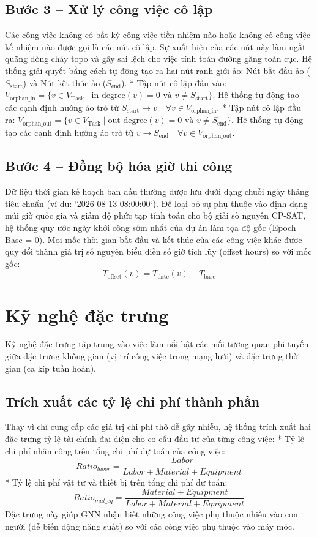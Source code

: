 \subsection{Bước 3 -- Xử lý công việc cô lập}
Các công việc không có bất kỳ công việc tiền nhiệm nào hoặc không có công việc kế nhiệm nào được gọi là các nút cô lập. Sự xuất hiện của các nút này làm ngắt quãng dòng chảy topo và gây sai lệch cho việc tính toán đường găng toàn cục. Hệ thống giải quyết bằng cách tự động tạo ra hai nút ranh giới ảo: Nút bắt đầu ảo ($S_{\text{start}}$) và Nút kết thúc ảo ($S_{\text{end}}$).
* Tập nút cô lập đầu vào: $V_{\text{orphan\_in}} = \{v \in V_{\text{Task}} \mid \text{in-degree}(v) = 0 \text{ và } v \neq S_{\text{start}}\}$. Hệ thống tự động tạo các cạnh định hướng ảo trỏ từ $S_{\text{start}} \rightarrow v \quad \forall v \in V_{\text{orphan\_in}}$.
* Tập nút cô lập đầu ra: $V_{\text{orphan\_out}} = \{v \in V_{\text{Task}} \mid \text{out-degree}(v) = 0 \text{ và } v \neq S_{\text{end}}\}$. Hệ thống tự động tạo các cạnh định hướng ảo trỏ từ $v \rightarrow S_{\text{end}} \quad \forall v \in V_{\text{orphan\_out}}$.

\subsection{Bước 4 -- Đồng bộ hóa giờ thi công}
Dữ liệu thời gian kế hoạch ban đầu thường được lưu dưới dạng chuỗi ngày tháng tiêu chuẩn (ví dụ: `2026-08-13 08:00:00`). Để loại bỏ sự phụ thuộc vào định dạng múi giờ quốc gia và giảm độ phức tạp tính toán cho bộ giải số nguyên CP-SAT, hệ thống quy ước ngày khởi công sớm nhất của dự án làm tọa độ gốc (Epoch Base = 0). Mọi mốc thời gian bắt đầu và kết thúc của các công việc khác được quy đổi thành giá trị số nguyên biểu diễn số giờ tích lũy (offset hours) so với mốc gốc:
$$T_{\text{offset}}(v) = T_{\text{date}}(v) - T_{\text{base}}$$

\section{Kỹ nghệ đặc trưng}
\label{sec:2.6_feature_engineering}

Kỹ nghệ đặc trưng tập trung vào việc làm nổi bật các mối tương quan phi tuyến giữa đặc trưng không gian (vị trí công việc trong mạng lưới) và đặc trưng thời gian (ca kíp tuần hoàn).

\subsection{Trích xuất các tỷ lệ chi phí thành phần}
Thay vì chỉ cung cấp các giá trị chi phí thô dễ gây nhiễu, hệ thống trích xuất hai đặc trưng tỷ lệ tài chính đại diện cho cơ cấu đầu tư của từng công việc:
* Tỷ lệ chi phí nhân công trên tổng chi phí dự toán của công việc:
$$Ratio_{labor} = \frac{Labor}{Labor + Material + Equipment}$$
* Tỷ lệ chi phí vật tư và thiết bị trên tổng chi phí dự toán:
$$Ratio_{mat\_eq} = \frac{Material + Equipment}{Labor + Material + Equipment}$$
Đặc trưng này giúp GNN nhận biết những công việc phụ thuộc nhiều vào con người (dễ biến động năng suất) so với các công việc phụ thuộc vào máy móc.

